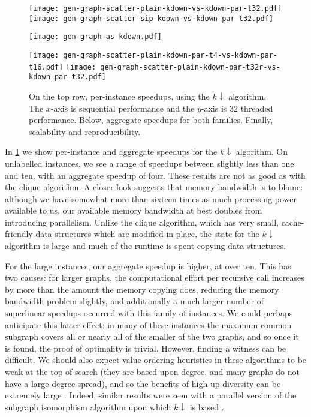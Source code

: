 \documentclass[sigconf]{acmart}
\begin{document}
\begin{figure}[tb]
    \texttt{[image: gen-graph-scatter-plain-kdown-vs-kdown-par-t32.pdf]}
    \hfill
    \texttt{[image: gen-graph-scatter-sip-kdown-vs-kdown-par-t32.pdf]}

    \vspace*{1em}

    \texttt{[image: gen-graph-as-kdown.pdf]}

    \vspace*{0.2em}

    \texttt{[image: gen-graph-scatter-plain-kdown-par-t4-vs-kdown-par-t16.pdf]}
    \hfill
    \texttt{[image: gen-graph-scatter-plain-kdown-par-t32r-vs-kdown-par-t32.pdf]}

    \caption{On the top row, per-instance speedups, using the $k{\downarrow}$ algorithm. The
    $x$-axis is sequential performance and the $y$-axis is 32 threaded performance. Below,
    aggregate speedups for both families. Finally, scalability and reproducibility.}\label{figure:kdownscatters}
\end{figure}

In \cref{figure:kdownscatters} we show per-instance and aggregate speedups for the $k{\downarrow}$
algorithm. On unlabelled instances, we see a range of speedups between slightly less than one and
ten, with an aggregate speedup of four. These results are not as good as with the clique algorithm.
A closer look suggests that memory bandwidth is to blame: although we have somewhat more than
sixteen times as much processing power available to us, our available memory bandwidth at best
doubles from introducing parallelism. Unlike the clique algorithm, which has very small,
cache-friendly data structures which are modified in-place, the state for the $k{\downarrow}$
algorithm is large and much of the runtime is spent copying data structures.

For the large instances, our aggregate speedup is higher, at over ten. This has two causes: for
larger graphs, the computational effort per recursive call increases by more than the amount the
memory copying does, reducing the memory bandwidth problem slightly, and additionally a much larger
number of superlinear speedups occurred with this family of instances. We could perhaps anticipate
this latter effect: in many of these instances the maximum common subgraph covers all or nearly all
of the smaller of the two graphs, and so once it is found, the proof of optimality is trivial.
However, finding a witness can be difficult. We should also expect value-ordering heuristics in
these algorithms to be weak at the top of search (they are based upon degree, and many graphs do not
have a large degree spread), and so the benefits of high-up diversity can be extremely large
\citep{DBLP:conf/ijcai/HarveyG95,DBLP:conf/cp/ChuSS09,DBLP:journals/topc/McCreeshP15}. Indeed,
similar results were seen with a parallel version of the subgraph isomorphism algorithm upon which
$k{\downarrow}$ is based \citep{DBLP:conf/cp/McCreeshP15}.
\end{document}

